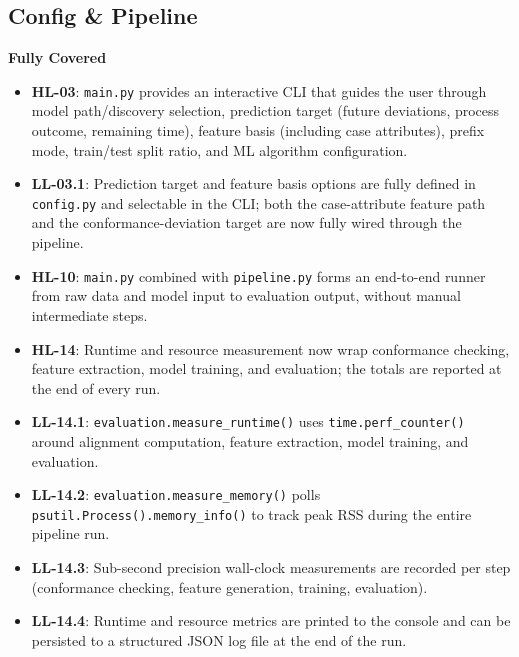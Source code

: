 \documentclass[12pt,a4paper]{article}
\newcommand{\newcov}[1]{\colorbox{green!40}{\textbf{#1}}}
\begin{document}
\subsection{Config \& Pipeline}

\textbf{Fully Covered}
\begin{itemize}
    \item \textbf{HL-03}: \texttt{main.py} provides an interactive CLI that guides the user through model path/discovery selection, prediction target (future deviations, process outcome, remaining time), feature basis (including case attributes), prefix mode, train/test split ratio, and ML algorithm configuration.
    \item \textbf{LL-03.1}: Prediction target and feature basis options are fully defined in \texttt{config.py} and selectable in the CLI; both the case-attribute feature path and the conformance-deviation target are now fully wired through the pipeline.
    \item \textbf{HL-10}: \texttt{main.py} combined with \texttt{pipeline.py} forms an end-to-end runner from raw data and model input to evaluation output, without manual intermediate steps.
    \item \newcov{HL-14}: Runtime and resource measurement now wrap conformance checking, feature extraction, model training, and evaluation; the totals are reported at the end of every run.
    \item \newcov{LL-14.1}: \texttt{evaluation.measure\_runtime()} uses \texttt{time.perf\_counter()} around alignment computation, feature extraction, model training, and evaluation.
    \item \newcov{LL-14.2}: \texttt{evaluation.measure\_memory()} polls \texttt{psutil.Process().memory\_info()} to track peak RSS during the entire pipeline run.
    \item \newcov{LL-14.3}: Sub-second precision wall-clock measurements are recorded per step (conformance checking, feature generation, training, evaluation).
    \item \newcov{LL-14.4}: Runtime and resource metrics are printed to the console and can be persisted to a structured JSON log file at the end of the run.
\end{itemize}
\end{document}
